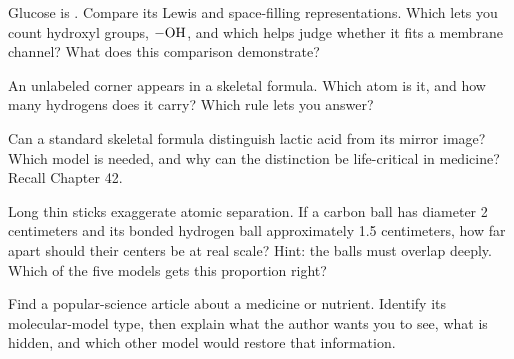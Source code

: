 \begin{sikaoti}
\item Glucose is . Compare its Lewis and space-filling representations. Which lets you count hydroxyl groups, $-\mathrm{OH}$, and which helps judge whether it fits a membrane channel? What does this comparison demonstrate?
\item An unlabeled corner appears in a skeletal formula. Which atom is it, and how many hydrogens does it carry? Which rule lets you answer?
\item Can a standard skeletal formula distinguish lactic acid from its mirror image? Which model is needed, and why can the distinction be life-critical in medicine? Recall Chapter 42.
\item Long thin sticks exaggerate atomic separation. If a carbon ball has diameter 2 centimeters and its bonded hydrogen ball approximately 1.5 centimeters, how far apart should their centers be at real scale? Hint: the balls must overlap deeply. Which of the five models gets this proportion right?
\item Find a popular-science article about a medicine or nutrient. Identify its molecular-model type, then explain what the author wants you to see, what is hidden, and which other model would restore that information.
\end{sikaoti}
